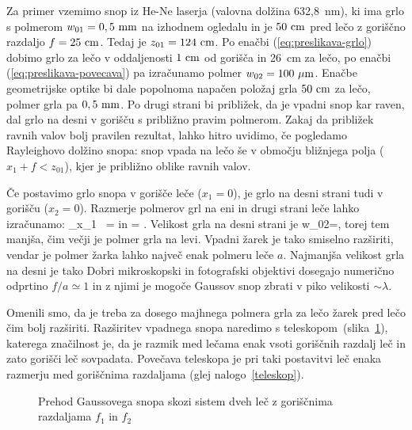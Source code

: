 Za primer vzemimo snop iz He-Ne laserja (valovna dolžina 632,8~nm), ki ima grlo s 
polmerom $w_{01}=0,5~\milli\metre$ na izhodnem ogledalu in je $50~\centi\metre$ pred lečo z 
goriščno razdaljo $f=25~\centi\metre$.
Tedaj je $z_{01}=124~\centi\metre$. Po enačbi (\ref{eq:preslikava-grlo})
dobimo grlo za lečo v oddaljenosti $1~\centi\metre$ od gorišča in 26~cm za lečo, 
po enačbi (\ref{eq:preslikava-povecava})
pa izračunamo polmer $w_{02}=100~\micro\metre$. Enačbe geometrijske optike bi
dale popolnoma napačen položaj grla $50~\centi\metre$ za lečo, polmer grla pa 
$0,5~\milli\metre$. Po drugi strani bi približek, da je vpadni
snop kar raven, dal grlo na desni v gorišču s približno pravim polmerom. Zakaj da približek ravnih 
valov bolj pravilen rezultat, lahko hitro uvidimo, če pogledamo
Rayleighovo dolžino snopa: snop vpada na lečo še v območju bližnjega polja ($x_1 + f < z_{01}$), kjer 
je približno oblike ravnih valov. 

Če postavimo grlo snopa v gorišče leče ($x_{1}=0$), je grlo na
desni strani tudi v gorišču ($x_{2}=0$). Razmerje polmerov grl
na eni in drugi strani leče lahko izračunamo:
\beq
\lim_{x_1 }~= \qquad \textrm{in} \qquad
{}= .
\eeq
Velikost grla na desni strani je 
\beq
w_{02}=,
\eeq
torej tem manjša, čim večji je polmer grla na levi. Vpadni žarek je tako smiselno
razširiti, vendar je polmer žarka lahko največ enak polmeru leče $a$. 
Najmanjša velikost grla na desni je tako 
Dobri mikroskopski in fotografski
objektivi dosegajo numerično odprtino $f/a\simeq1$ in z njimi je mogoče Gaussov snop
zbrati v piko velikosti $\sim\lambda$. 

Omenili smo, da je treba za dosego majhnega polmera grla za lečo žarek pred lečo čim bolj razširiti.
Razširitev vpadnega snopa naredimo s teleskopom~(slika~\ref{fig:Prehod-Gaussovega-snopa-teleskop}),
katerega značilnost je, da je razmik med lečama enak vsoti goriščnih razdalj leč in zato gorišči
leč sovpadata. Povečava teleskopa je pri taki postavitvi leč enaka razmerju med goriščnima razdaljama 
(glej nalogo~\ref{teleskop}).

\begin{figure}[h]
\def\svgwidth{140truemm} 

\caption{Prehod Gaussovega snopa
skozi sistem dveh leč z goriščnima razdaljama $f_{1}$ in $f_{2}$}
\label{fig:Prehod-Gaussovega-snopa-teleskop}
\end{figure}

